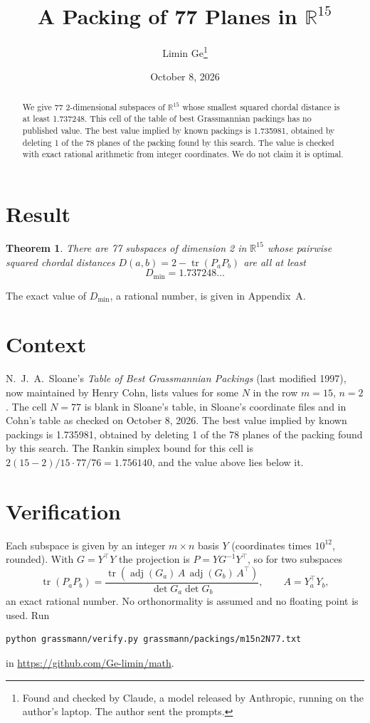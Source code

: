 \documentclass[11pt,a4paper]{article}
\title{A Packing of 77 Planes in $\mathbb{R}^{15}$}
\author{Limin Ge\thanks{Found and checked by Claude, a model released by Anthropic, running on the author's laptop. The author sent the prompts.}}
\date{October 8, 2026}
\newtheorem*{theorem}{Theorem}
\begin{document}
\maketitle
\begin{abstract}
We give 77 2-dimensional subspaces of $\mathbb{R}^{15}$ whose smallest squared chordal distance is at least 1.737248. This cell of the table of best Grassmannian packings has no published value. The best value implied by known packings is 1.735981, obtained by deleting 1 of the 78 planes of the packing found by this search. The value is checked with exact rational arithmetic from integer coordinates. We do not claim it is optimal.
\end{abstract}

\section{Result}
\begin{theorem}
There are 77 subspaces of dimension 2 in $\mathbb{R}^{15}$ whose pairwise squared chordal distances $D(a,b) = 2 - \operatorname{tr}(P_aP_b)$ are all at least
\[ D_{\min} = 1.737248\ldots \]
\end{theorem}
The exact value of $D_{\min}$, a rational number, is given in Appendix~A.


\section{Context}
N.~J.~A.~Sloane's \emph{Table of Best Grassmannian Packings} (last modified 1997), now maintained by Henry Cohn, lists values for some $N$ in the row $m=15$, $n=2$. The cell $N=77$ is blank in Sloane's table, in Sloane's coordinate files and in Cohn's table as checked on October 8, 2026. The best value implied by known packings is 1.735981, obtained by deleting 1 of the 78 planes of the packing found by this search. The Rankin simplex bound for this cell is $2(15-2)/15\cdot 77/76 = 1.756140$, and the value above lies below it.


\section{Verification}
Each subspace is given by an integer $m\times n$ basis $Y$ (coordinates times $10^{12}$, rounded). With $G=Y^\top Y$ the projection is $P=YG^{-1}Y^\top$, so for two subspaces
\[ \operatorname{tr}(P_aP_b)=\frac{\operatorname{tr}(\operatorname{adj}(G_a)\,A\,\operatorname{adj}(G_b)\,A^\top)}{\det G_a\det G_b},\qquad A=Y_a^\top Y_b, \]
an exact rational number. No orthonormality is assumed and no floating point is used. Run
\begin{verbatim}
python grassmann/verify.py grassmann/packings/m15n2N77.txt
\end{verbatim}
in \url{https://github.com/Ge-limin/math}.
\end{document}
